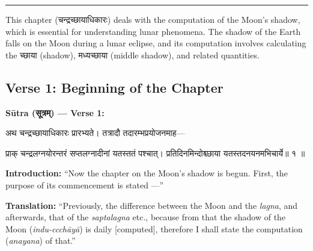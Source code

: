 \documentclass[11pt,a4paper]{article}
\newcommand{\dev}[1]{{\devanagarifont #1}}
\newenvironment{sanskritverse}{%
  \begin{center}\begin{minipage}{0.95\textwidth}
  \setlength{\leftskip}{1em}
  \setlength{\rightskip}{1em}
  \dev
}{\end{minipage}\end{center}}
\newenvironment{paracol}[1]{\begingroup}{\endgroup}
\newcommand{\switchcolumn}[1][]{%
  \ifnum#1=0\relax\else\par\nobreak\vspace{0.5em}\par\nobreak\fi%
}
\begin{document}
\begin{center}
\textcolor{rulecolor}{\rule{0.8\textwidth}{0.5pt}}
\end{center}

This chapter (\dev{चन्द्रच्छायाधिकारः}) deals with the computation of the Moon's shadow, which is essential for understanding lunar phenomena. The shadow of the Earth falls on the Moon during a lunar eclipse, and its computation involves calculating the \dev{च्छाया} (shadow), \dev{मध्यच्छाया} (middle shadow), and related quantities.

\subsection{Verse 1: Beginning of the Chapter}

\vspace{0.5em}
\noindent\textbf{Sūtra (\dev{सूत्रम्}) — Verse 1:}

\begin{paracol}{2}

\begin{sanskritverse}
अथ चन्द्रच्छायाधिकारः प्रारभ्यते। तत्रादौ तदारम्भप्रयोजनमाह—
\end{sanskritverse}

\begin{sanskritverse}
प्राक् चन्द्रलग्नयोरन्तरं सप्तलग्नादीनां यतस्ततं पश्चात्।
प्रतिदिनमिन्दोश्च्छाया यतस्तदनयनमभिचार्ये॥ १ ॥
\end{sanskritverse}

\switchcolumn

\textbf{Introduction:} ``Now the chapter on the Moon's shadow is begun. First, the purpose of its commencement is stated ---''

\textbf{Translation:} ``Previously, the difference between the Moon and the \textit{lagna}, and afterwards, that of the \textit{saptalagna} etc., because from that the shadow of the Moon (\textit{indu-ccchāyā}) is daily [computed], therefore I shall state the computation (\textit{anayana}) of that.''

\end{paracol}

\vspace{0.5em}
\end{document}
